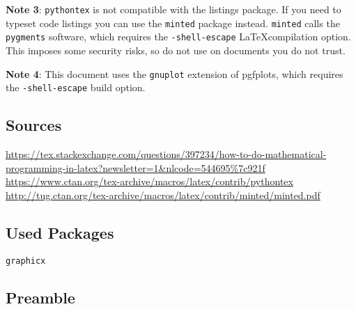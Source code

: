 \documentclass{article}
\begin{document}
\textbf{Note 3}: \verb|pythontex| is not compatible with the listings package. If you need to typeset code listings you can use the \verb|minted| package instead. \verb|minted| calls the \verb|pygments| software, which requires the \texttt{-shell-escape} \LaTeX compilation option. This imposes some security risks, so do not use on documents you do not trust.

\textbf{Note 4}: This document uses the \verb|gnuplot| extension of pgfplots, which requires the \texttt{-shell-escape} build option.

\subsection*{Sources}
\url{https://tex.stackexchange.com/questions/397234/how-to-do-mathematical-programming-in-latex?newsletter=1&nlcode=544695%7c921f}\\
\url{https://www.ctan.org/tex-archive/macros/latex/contrib/pythontex}
\url{http://tug.ctan.org/tex-archive/macros/latex/contrib/minted/minted.pdf}

\subsection*{Used Packages}
\verb|graphicx|

\subsection*{Preamble}
\begin{latex}
\usepackage[gobble=auto]{pythontex}
\usepackage{pgfplots} %
\usepackage{graphicx} %

\end{latex}
\end{document}
